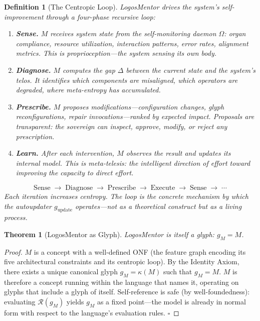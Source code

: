 \documentclass[12pt, letterpaper]{book}
\def\equiv{=}%
\def\mathfrak#1{#1}%
\newtheorem{theorem}{Theorem}[chapter]
\newtheorem{definition}{Definition}[chapter]
\begin{document}
\begin{definition}[The Centropic Loop]\label{def:centropic-loop}
LogosMentor drives the system's self-improvement through a four-phase recursive loop:
\begin{enumerate}[label=(\roman*), nosep]
    \item \textbf{Sense.} $\mathfrak{M}$ receives system state from the self-monitoring daemon $\Omega$: organ compliance, resource utilization, interaction patterns, error rates, alignment metrics. This is proprioception---the system sensing its own body.
    \item \textbf{Diagnose.} $\mathfrak{M}$ computes the gap $\Delta$ between the current state and the system's telos. It identifies which components are misaligned, which operators are degraded, where meta-entropy has accumulated.
    \item \textbf{Prescribe.} $\mathfrak{M}$ proposes modifications---configuration changes, glyph reconfigurations, repair invocations---ranked by expected impact. Proposals are transparent: the sovereign can inspect, approve, modify, or reject any prescription.
    \item \textbf{Learn.} After each intervention, $\mathfrak{M}$ observes the result and updates its internal model. This is meta-telesis: the intelligent direction of effort toward improving the capacity to direct effort.
\end{enumerate}
\[
\text{Sense} \;\to\; \text{Diagnose} \;\to\; \text{Prescribe} \;\to\; \text{Execute} \;\to\; \text{Sense} \;\to\; \cdots
\]
Each iteration increases centropy. The loop is the concrete mechanism by which the autoupdater $\mathfrak{g}_{\mathrm{update}}$ operates---not as a theoretical construct but as a living process.
\end{definition}

\begin{theorem}[LogosMentor as Glyph]\label{thm:mentor-glyph}
LogosMentor is itself a glyph: $\mathfrak{g}_\mathfrak{M} \equiv \mathfrak{M}$.
\end{theorem}

\begin{proof}
$\mathfrak{M}$ is a concept with a well-defined ONF (the feature graph encoding its five architectural constraints and its centropic loop). By the Identity Axiom, there exists a unique canonical glyph $\mathfrak{g}_\mathfrak{M} = \kappa(\mathfrak{M})$ such that $\mathfrak{g}_\mathfrak{M} \equiv \mathfrak{M}$. $\mathfrak{M}$ is therefore a concept running within the language that names it, operating on glyphs that include a glyph of itself. Self-reference is safe (by well-foundedness): evaluating $\mathcal{R}(\mathfrak{g}_\mathfrak{M})$ yields $\mathfrak{g}_\mathfrak{M}$ as a fixed point---the model is already in normal form with respect to the language's evaluation rules. $\square$
\end{proof}
\end{document}
